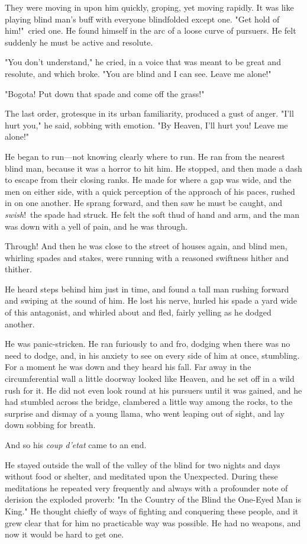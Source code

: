 \documentclass[courier]{sffms}
\begin{document}
They were moving in upon him quickly, groping, yet moving rapidly. It
was like playing blind man's buff with everyone blindfolded except
one. "Get hold of him!"\ cried one. He found himself in the arc of a
loose curve of pursuers. He felt suddenly he must be active and
resolute.

"You don't understand," he cried, in a voice that was meant to be
great and resolute, and which broke. "You are blind and I can
see. Leave me alone!"

"Bogota! Put down that spade and come off the grass!"

The last order, grotesque in its urban familiarity, produced a gust of
anger.  "I'll hurt you," he said, sobbing with emotion. "By Heaven,
I'll hurt you! Leave me alone!"

He began to run---not knowing clearly where to run. He ran from the
nearest blind man, because it was a horror to hit him. He stopped, and
then made a dash to escape from their closing ranks. He made for where
a gap was wide, and the men on either side, with a quick perception of
the approach of his paces, rushed in on one another. He sprang
forward, and then saw he must be caught, and \emph{swish}!\ the spade had
struck. He felt the soft thud of hand and arm, and the man was down
with a yell of pain, and he was through.

Through! And then he was close to the street of houses again, and
blind men, whirling spades and stakes, were running with a reasoned
swiftness hither and thither.

He heard steps behind him just in time, and found a tall man rushing
forward and swiping at the sound of him. He lost his nerve, hurled his
spade a yard wide of this antagonist, and whirled about and fled,
fairly yelling as he dodged another.

He was panic-stricken. He ran furiously to and fro, dodging when there
was no need to dodge, and, in his anxiety to see on every side of him
at once, stumbling. For a moment he was down and they heard his
fall. Far away in the circumferential wall a little doorway looked
like Heaven, and he set off in a wild rush for it. He did not even
look round at his pursuers until it was gained, and he had stumbled
across the bridge, clambered a little way among the rocks, to the
surprise and dismay of a young llama, who went leaping out of sight,
and lay down sobbing for breath.

And so his \emph{coup d'etat} came to an end.

He stayed outside the wall of the valley of the blind for two nights
and days without food or shelter, and meditated upon the
Unexpected. During these meditations he repeated very frequently and
always with a profounder note of derision the exploded proverb: "In
the Country of the Blind the One-Eyed Man is King." He thought chiefly
of ways of fighting and conquering these people, and it grew clear
that for him no practicable way was possible. He had no weapons, and
now it would be hard to get one.
\end{document}
